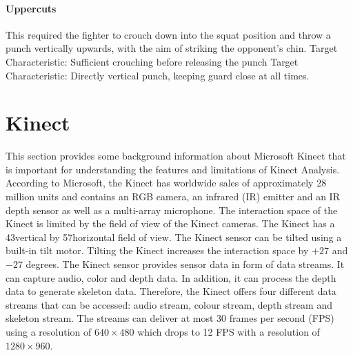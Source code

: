 \paragraph{Uppercuts}
This required the fighter to crouch down into the squat position and throw a punch vertically upwards, with the aim of striking the opponent's chin.
Target Characteristic: Sufficient crouching before releasing the punch\newline
Target Characteristic: Directly vertical punch, keeping guard close at all times.\newline

\section{Kinect}
This section provides some background information about Microsoft Kinect that is important for understanding the features and limitations of Kinect Analysis. According to Microsoft, the Kinect  has worldwide sales of approximately 28 million units and contains an RGB camera, an infrared (IR) emitter and an IR depth sensor as well as a multi-array microphone. The interaction space of the Kinect is limited by the field of view of the Kinect cameras. The Kinect has a 43\degree vertical by 57\degree horizontal field of view. The Kinect sensor can be tilted using a built-in tilt motor. Tilting the Kinect increases the interaction space by $+27$ and $-27$ degrees.
The Kinect sensor provides sensor data in form of data streams. It can capture audio, color and depth data. In addition, it can process the depth data to generate skeleton data. Therefore, the Kinect offers four different data streams that can be accessed: audio stream, colour stream, depth stream and skeleton stream. The streams can deliver at most 30 frames per second (FPS) using a resolution of $640\times480$ which drops to 12 FPS with a resolution of $1280\times960$.

